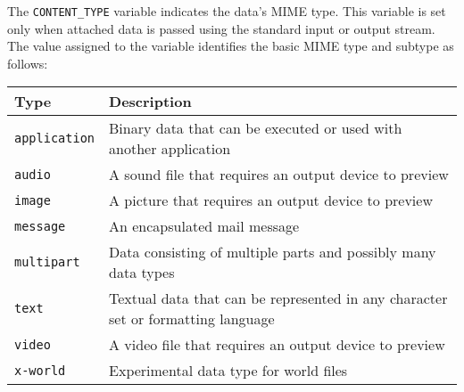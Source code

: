 \begin{description}
The \verb|CONTENT_TYPE| variable indicates the data's MIME type. This
variable is set only when attached data is passed using the standard input
or output stream. The value assigned to the variable identifies the basic MIME
type and subtype as follows:
\begin{center}
\begin{longtable}{|l|p{9cm}|}
\hline
{\bf Type} & {\bf Description}\\
\hline
\verb|application| & Binary data that can be executed or used with another 
application\\\hline
\verb|audio| & A sound file that requires an output device to preview\\\hline
\verb|image| & A picture that requires an output device to preview\\\hline
\verb|message| & An encapsulated mail message\\\hline
\verb|multipart| & Data consisting of multiple parts and possibly many data 
types\\\hline
\verb|text| & Textual data that can be represented in any character set or formatting language\\\hline
\verb|video| & A video file that requires an output device to preview\\\hline
\verb|x-world|   & Experimental data type for world files\\\hline
\end{longtable}
\end{center}


\end{description}

